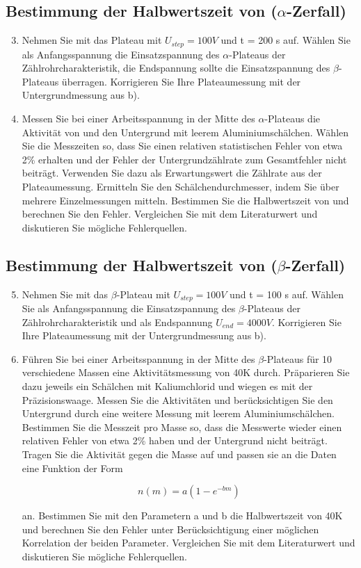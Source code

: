 \subsection{Bestimmung der Halbwertszeit von  ($\alpha$-Zerfall)}
\begin{enumerate}
\setcounter{enumi}{2}
\item Nehmen Sie mit  das Plateau mit $U_{step} = 100 V$ und t = 200 s auf. Wählen Sie als Anfangsspannung die Einsatzspannung des $\alpha$-Plateaus der Zählrohrcharakteristik, die Endspannung sollte die Einsatzspannung des $\beta$-Plateaus überragen. Korrigieren Sie Ihre Plateaumessung mit der Untergrundmessung aus b).

\item Messen Sie bei einer Arbeitsspannung in der Mitte des $\alpha$-Plateaus die Aktivität von  und den Untergrund mit leerem Aluminiumschälchen. Wählen Sie die Messzeiten so, dass Sie einen relativen statistischen Fehler von etwa 2\% erhalten und der Fehler der Untergrundzählrate zum Gesamtfehler nicht beiträgt. Verwenden Sie dazu als Erwartungswert die Zählrate aus der Plateaumessung. Ermitteln Sie den Schälchendurchmesser, indem Sie über mehrere Einzelmessungen mitteln.
Bestimmen Sie die Halbwertszeit von  und berechnen Sie den Fehler.
Vergleichen Sie mit dem Literaturwert und diskutieren Sie mögliche Fehlerquellen.
\end{enumerate}

\subsection{Bestimmung der Halbwertszeit von  ($\beta$-Zerfall)}
\begin{enumerate}
\setcounter{enumi}{4}
\item Nehmen Sie mit  das $\beta$-Plateau mit $U_{step} = 100 V$ und t = 100 s auf. Wählen Sie als Anfangsspannung die Einsatzspannung des $\beta$-Plateaus der Zählrohrcharakteristik und als Endspannung $U_{end} = 4000 V$. Korrigieren Sie Ihre Plateaumessung mit der
Untergrundmessung aus b).
\item Führen Sie bei einer Arbeitsspannung in der Mitte des $\beta$-Plateaus für 10 verschiedene Massen eine Aktivitätsmessung von 40K durch. Präparieren Sie dazu jeweils ein Schälchen mit Kaliumchlorid und wiegen es mit der Präzisionswaage.
Messen Sie die Aktivitäten und berücksichtigen Sie den Untergrund durch eine weitere Messung mit leerem Aluminiumschälchen. Bestimmen Sie die Messzeit pro Masse so, dass die Messwerte wieder einen relativen Fehler von etwa 2\% haben und der Untergrund nicht beiträgt. Tragen Sie die Aktivität gegen die Masse auf und passen sie an die Daten eine Funktion der Form

$$ n\left( m \right) = a \left( 1 - e^{-bm} \right)$$

an. Bestimmen Sie mit den Parametern a und b die Halbwertszeit von 40K und berechnen Sie den Fehler unter Berücksichtigung einer möglichen Korrelation der beiden Parameter. Vergleichen Sie mit dem Literaturwert und diskutieren Sie mögliche Fehlerquellen.


\end{enumerate}

